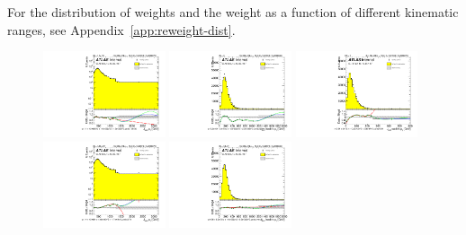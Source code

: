 For the distribution of weights and the weight as a function of different kinematic ranges, see Appendix~\ref{app:reweight-dist}.
\begin{figure}[htbp!]
\begin{center}
\includegraphics[width=0.32\textwidth,angle=-90]{figures/boosted/Reweight/Fits/Moriond_NoTag_2Trk_split_lead_Incl_sublHCand_Pt_m_1.pdf}
\includegraphics[width=0.32\textwidth,angle=-90]{figures/boosted/Reweight/Fits/Moriond_NoTag_2Trk_split_lead_Incl_sublHCand_trk0_Pt.pdf}
\includegraphics[width=0.32\textwidth,angle=-90]{figures/boosted/Reweight/Fits/Moriond_NoTag_2Trk_split_lead_Incl_sublHCand_trk1_Pt.pdf} \\
\includegraphics[width=0.32\textwidth,angle=-90]{figures/boosted/Reweight/Fits/Moriond_bkg_0_NoTag_2Trk_split_lead_Incl_sublHCand_Pt_m_1.pdf}
\includegraphics[width=0.32\textwidth,angle=-90]{figures/boosted/Reweight/Fits/Moriond_bkg_0_NoTag_2Trk_split_lead_Incl_sublHCand_trk0_Pt.pdf}

\end{center}
\end{figure}
